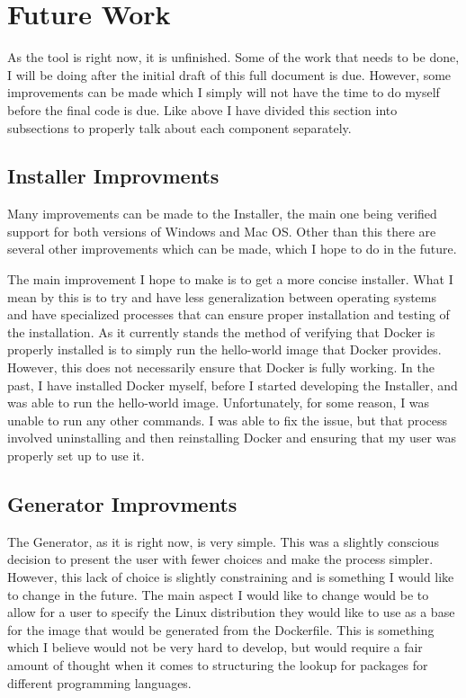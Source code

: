 \section{Future Work}
\label{sec:future}

As the tool is right now, it is unfinished. Some of the work that needs to be done, I will be doing after the initial draft of this full document is due. However, some improvements can be made which I simply will not have the time to do myself before the final code is due. Like above I have divided this section into subsections to properly talk about each component separately.

\subsection{Installer Improvments}
\label{sec:installerImprove}

Many improvements can be made to the Installer, the main one being verified support for both versions of Windows and Mac OS. Other than this there are several other improvements which can be made, which I hope to do in the future.

The main improvement I hope to make is to get a more concise installer. What I mean by this is to try and have less generalization between operating systems and have specialized processes that can ensure proper installation and testing of the installation. As it currently stands the method of verifying that Docker is properly installed is to simply run the hello-world image that Docker provides. However, this does not necessarily ensure that Docker is fully working. In the past, I have installed Docker myself, before I started developing the Installer, and was able to run the hello-world image. Unfortunately, for some reason, I was unable to run any other commands. I was able to fix the issue, but that process involved uninstalling and then reinstalling Docker and ensuring that my user was properly set up to use it.

\subsection{Generator Improvments}
\label{sec:generatorImprove}

The Generator, as it is right now, is very simple. This was a slightly conscious decision to present the user with fewer choices and make the process simpler. However, this lack of choice is slightly constraining and is something I would like to change in the future. The main aspect I would like to change would be to allow for a user to specify the Linux distribution they would like to use as a base for the image that would be generated from the Dockerfile. This is something which I believe would not be very hard to develop, but would require a fair amount of thought when it comes to structuring the lookup for packages for different programming languages.


